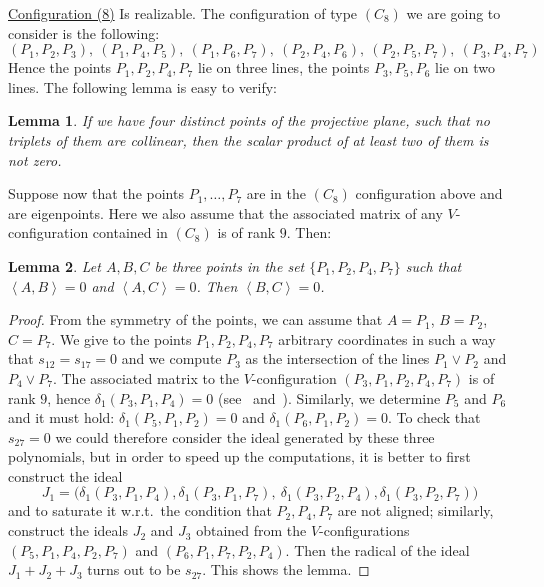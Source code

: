 \documentclass{amsart}
\theoremstyle{plain}
\newtheorem{lemma}{Lemma}[section]
\theoremstyle{definition}
\newcommand{\scl}[2]{\left\langle {#1}, {#2} \right\rangle}
\begin{document}
\underline{Configuration (8)} Is realizable.  
The configuration of type $(C_8)$ we are going to consider is the 
following: 
\begin{equation}
\label{config:c8}
(P_1, P_2, P_3), \ (P_1, P_4, P_5), \ (P_1, P_6, P_7), \ (P_2, P_4, P_6), \ 
(P_2, P_5, P_7), \ (P_3, P_4, P_7)    
\end{equation}
Hence the points $P_1, P_2, P_4, P_7$ lie on three lines, the points
$P_3, P_5, P_6$ lie on two lines.
The following lemma is easy to verify:
\begin{lemma}
\label{lemma:6ortog} If we have four distinct points of the projective
plane, such that no triplets of them are collinear, then the scalar 
product of at least two of them is not zero.
\end{lemma}
Suppose now that the points $P_1, \dotsc, P_7$ are in the $(C_8)$ 
configuration above and are eigenpoints. Here we also assume that the 
associated matrix of any 
$V$-configuration contained in $(C_8)$ is of rank $9$. Then:
\begin{lemma}
\label{lemma:three_s_zero}
    Let $A, B, C$ be three points in the set $\{P_1, P_2, P_4, P_7\}$
    such that $\scl{A}{B} = 0$ and $\scl{A}{C} = 0$. Then $\scl{B}{C} = 0$.
\end{lemma}
\begin{proof}
{}From the symmetry of the points, we can assume that $A=P_1$, $B=P_2$, 
$C=P_7$.
We give to the points $P_1, P_2, P_4, P_7$ arbitrary coordinates 
in such a way that $s_{12}= s_{17}=0$ and 
we compute $P_3$ as the intersection of the lines $P_1 \vee P_2$ and 
$P_4 \vee P_7$. The associated matrix to the $V$-configuration 
$(P_3, P_1, P_2, P_4, P_7)$ 
is of rank $9$, hence $\delta_1(P_3, P_1, P_4) = 0$ 
(see~ and~). 
Similarly, we determine $P_5$ and $P_6$ and it must hold:
$\delta_1(P_5, P_1, P_2) = 0$ and $\delta_1(P_6, P_1, P_2) = 0$. To 
check  that $s_{27} = 0$ we could 
therefore consider the ideal generated by these three polynomials, but 
in order to speed up the computations, it is better to first construct
the ideal 
\[
J_1 = \bigl(\delta_1(P_3, P_1, P_4), \delta_1(P_3, P_1, P_7), \
             \delta_1(P_3, P_2, P_4), \delta_1(P_3, P_2, P_7)\bigr)
\]
and to saturate it w.r.t.\ the condition that $P_2, P_4, P_7$ are not 
aligned; similarly, construct the ideals $J_2$ and $J_3$ obtained 
from the $V$-configurations $(P_5, P_1, P_4, P_2, P_7)$ and 
$(P_6, P_1, P_7, P_2, P_4)$. Then the radical of the ideal $J_1+J_2+J_3$
turns out to be $s_{27}$. This shows the lemma.
\end{proof}
\end{document}
